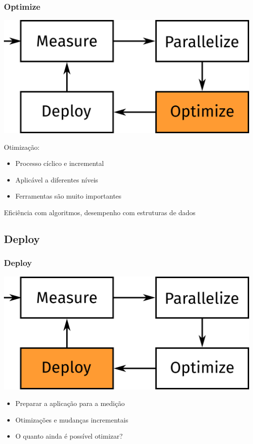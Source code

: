 \documentclass[10pt, compress]{beamer}
\begin{document}
\begin{frame}
    \frametitle{Optimize}
    \begin{center}
    \includegraphics[width=.4\textwidth]{MPOD_O}
    \end{center}

    \vfill

    \pause
    Otimização:
    \begin{itemize}
        \item Processo \alert{cíclico} \pause e \alert{incremental}
            \pause
        \item Aplicável a \alert{diferentes níveis}
            \pause
        \item \alert{Ferramentas} são muito importantes
    \end{itemize}

    \pause
    \begin{center}
    \alert{Eficiência com algoritmos}, \pause \alert{desempenho com estruturas de dados}
    \end{center}
\end{frame}

\subsection{Deploy}

\begin{frame}
    \frametitle{Deploy}
    \begin{center}
    \includegraphics[width=.4\textwidth]{MPOD_D}
    \end{center}

    \vfill

    \pause
    \begin{itemize}
        \item Preparar a aplicação para a \alert{medição}
            \pause
        \item Otimizações e mudanças \alert{incrementais}
            \pause
        \item O quanto ainda é \alert{possível} otimizar?
    \end{itemize}
\end{frame}
\end{document}
